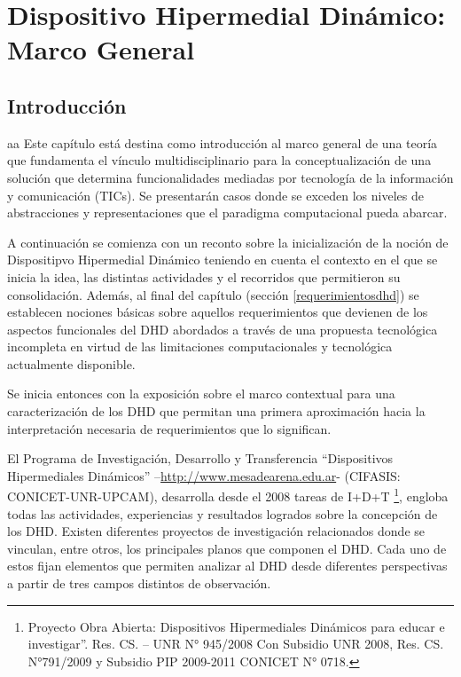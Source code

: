 
\chapter{Dispositivo Hipermedial Dinámico: Marco General} \label{cap:2}

\section{Introducción}
aa
Este capítulo está destina como introducción al marco general de una teoría
que fundamenta el vínculo multidisciplinario para la conceptualización de
una solución que determina funcionalidades mediadas por tecnología de la
información y comunicación (TICs). Se presentarán casos donde se exceden los
niveles de abstracciones y representaciones que el paradigma computacional pueda
abarcar. 

A continuación se comienza con un reconto sobre la inicialización de la
noción de Dispositipvo Hipermedial Dinámico teniendo en cuenta el contexto en
el que se inicia la idea, las distintas actividades y el recorridos que
permitieron su consolidación. Además, al final del capítulo (sección 
\ref{requerimientosdhd}) se establecen nociones básicas sobre aquellos
requerimientos que devienen de los aspectos funcionales del DHD abordados a
través de una propuesta tecnológica incompleta en virtud de las
limitaciones computacionales y tecnológica actualmente disponible. 

Se inicia entonces con la exposición sobre el marco contextual para una
caracterización de los DHD que permitan una primera aproximación hacia la
interpretación necesaria de requerimientos que lo significan. 

El Programa de Investigación, Desarrollo y Transferencia
“Dispositivos Hipermediales Dinámicos” –\url{http://www.mesadearena.edu.ar}-
(CIFASIS: CONICET-UNR-UPCAM), desarrolla desde el 2008 tareas de I+D+T \footnote
{Proyecto Obra Abierta: Dispositivos Hipermediales Dinámicos para educar e
investigar”. Res. CS. – UNR N° 945/2008 Con Subsidio UNR 2008, Res. CS.
N°791/2009 y Subsidio PIP 2009-2011 CONICET N° 0718.}, engloba todas las
actividades, experiencias y resultados logrados sobre la concepción de los DHD.
Existen diferentes proyectos de investigación relacionados donde se vinculan,
entre otros, los principales planos que componen el DHD. Cada uno de estos fijan
elementos que permiten analizar al DHD desde diferentes perspectivas a partir de
tres campos distintos de observación. 

